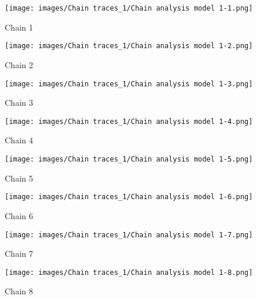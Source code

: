 \documentclass[12pt]{article}
\begin{document}
\begin{figure}[!htb]
   \begin{minipage}{0.48\textwidth}
     \centering
     \texttt{[image: images/Chain traces\_1/Chain analysis model 1-1.png]}
     \caption{Chain 1}\label{Fig:Chain 1}
   \end{minipage}\hfill
   \begin{minipage}{0.48\textwidth}
     \centering
     \texttt{[image: images/Chain traces\_1/Chain analysis model 1-2.png]}
     \caption{Chain 2}\label{Fig: Chain 2}
   \end{minipage}
\end{figure}

\begin{figure}[!htb]
   \begin{minipage}{0.48\textwidth}
     \centering
     \texttt{[image: images/Chain traces\_1/Chain analysis model 1-3.png]}
     \caption{Chain 3}\label{Fig:Chain 3}
   \end{minipage}\hfill
   \begin{minipage}{0.48\textwidth}
     \centering
     \texttt{[image: images/Chain traces\_1/Chain analysis model 1-4.png]}
     \caption{Chain 4}\label{Fig: Chain 4}
   \end{minipage}
\end{figure}

\begin{figure}[!htb]
   \begin{minipage}{0.48\textwidth}
     \centering
     \texttt{[image: images/Chain traces\_1/Chain analysis model 1-5.png]}
     \caption{Chain 5}\label{Fig:Chain 5}
   \end{minipage}\hfill
   \begin{minipage}{0.48\textwidth}
     \centering
     \texttt{[image: images/Chain traces\_1/Chain analysis model 1-6.png]}
     \caption{Chain 6}\label{Fig: Chain 6}
   \end{minipage}
\end{figure}

\begin{figure}[!htb]
   \begin{minipage}{0.48\textwidth}
     \centering
     \texttt{[image: images/Chain traces\_1/Chain analysis model 1-7.png]}
     \caption{Chain 7}\label{Fig:Chain 7}
   \end{minipage}\hfill
   \begin{minipage}{0.48\textwidth}
     \centering
     \texttt{[image: images/Chain traces\_1/Chain analysis model 1-8.png]}
     \caption{Chain 8}\label{Fig: Chain 8}
   \end{minipage}
\end{figure}
\end{document}
